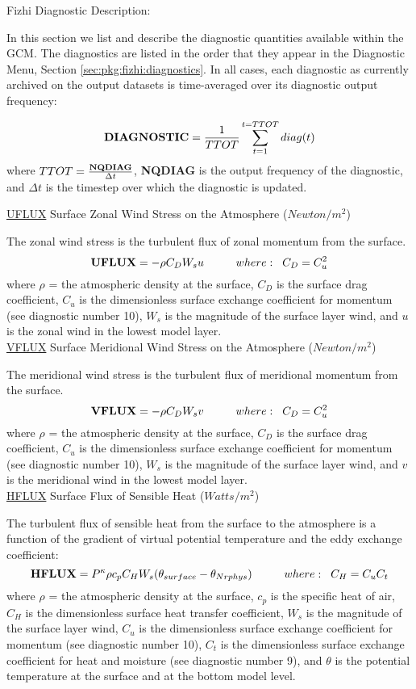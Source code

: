 \newpage

Fizhi Diagnostic Description:

In this section we list and describe the diagnostic quantities available within the 
GCM.  The diagnostics are listed in the order that they appear in the 
Diagnostic Menu, Section \ref{sec:pkg:fizhi:diagnostics}.
In all cases, each diagnostic as currently archived on the output datasets
is time-averaged over its diagnostic output frequency:

\[
{\bf DIAGNOSTIC} = {1 \over TTOT} \sum_{t=1}^{t=TTOT} diag(t)
\]
where $TTOT = {{\bf NQDIAG} \over \Delta t}$, {\bf NQDIAG} is the 
output frequency of the diagnostic, and $\Delta t$ is
the timestep over which the diagnostic is updated.  

{ \underline {UFLUX} Surface Zonal Wind Stress on the Atmosphere ($Newton/m^2$) } 

The zonal wind stress is the turbulent flux of zonal momentum from 
the surface. 
\[
{\bf UFLUX} =  - \rho C_D W_s u \hspace{1cm}where: \hspace{.2cm}C_D = C^2_u
\]
where $\rho$ = the atmospheric density at the surface, $C_{D}$ is the surface
drag coefficient, $C_u$ is the dimensionless surface exchange coefficient for momentum 
(see diagnostic number 10), $W_s$ is the magnitude of the surface layer wind, and $u$ is 
the zonal wind in the lowest model layer.
\\


{ \underline {VFLUX} Surface Meridional Wind Stress on the Atmosphere ($Newton/m^2$) } 

The meridional wind stress is the turbulent flux of meridional momentum from 
the surface. 
\[
{\bf VFLUX} =  - \rho C_D W_s v \hspace{1cm}where: \hspace{.2cm}C_D = C^2_u
\]
where $\rho$ = the atmospheric density at the surface, $C_{D}$ is the surface
drag coefficient, $C_u$ is the dimensionless surface exchange coefficient for momentum 
(see diagnostic number 10), $W_s$ is the magnitude of the surface layer wind, and $v$ is 
the meridional wind in the lowest model layer.
\\

{ \underline {HFLUX} Surface Flux of Sensible Heat ($Watts/m^2$) } 

The turbulent flux of sensible heat from the surface to the atmosphere is a function of the
gradient of virtual potential temperature and the eddy exchange coefficient:
\[
{\bf HFLUX} =  P^{\kappa}\rho c_{p} C_{H} W_s (\theta_{surface} - \theta_{Nrphys})
\hspace{1cm}where: \hspace{.2cm}C_H = C_u C_t
\]
where $\rho$ = the atmospheric density at the surface, $c_{p}$ is the specific
heat of air, $C_{H}$ is the dimensionless surface heat transfer coefficient, $W_s$ is the 
magnitude of the surface layer wind, $C_u$ is the dimensionless surface exchange coefficient 
for momentum (see diagnostic number 10), $C_t$ is the dimensionless surface exchange coefficient 
for heat and moisture (see diagnostic number 9), and $\theta$ is the potential temperature 
at the surface and at the bottom model level.
\\


